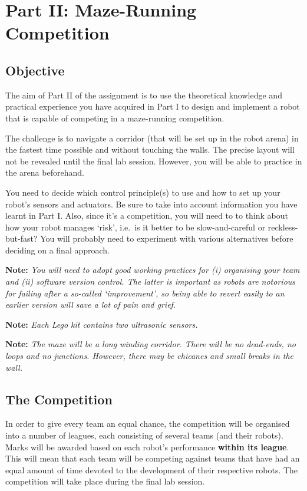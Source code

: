\documentclass[hidelinks,a4paper,11pt]{article}
\begin{document}
\newpage
\section{Part II: Maze-Running Competition}

\subsection{Objective}

The aim of Part II of the assignment is to use the theoretical knowledge and practical experience you have acquired in Part I to design and implement a robot that is capable of competing in a maze-running competition.

The challenge is to navigate a corridor (that will be set up in the robot arena) in the fastest time possible and without touching the walls.  The precise layout will not be revealed until the final lab session.  However, you will be able to practice in the arena beforehand.

You need to decide which control principle(s) to use and how to set up your robot's sensors and actuators.  Be sure to take into account information you have learnt in Part I.  Also, since it's a competition, you will need to to think about how your robot manages `risk', i.e.\ is it better to be slow-and-careful or reckless-but-fast?  You will probably need to experiment with various alternatives before deciding on a final approach.

{\bfseries Note:}  \emph{You will need to adopt good working practices for (i) organising your team and (ii) software version control.  The latter is important as robots are notorious for failing after a so-called `improvement', so being able to revert easily to an earlier version will save a lot of pain and grief.}

{\bfseries Note:}  \emph{Each Lego kit contains two ultrasonic sensors.}

{\bfseries Note:}  \emph{The maze will be a long winding corridor.  There will be no dead-ends, no loops and no junctions.  However, there may be chicanes and small breaks in the wall.}


\subsection{The Competition}

In order to give every team an equal chance, the competition will be organised into a number of leagues, each consisting of several teams (and their robots).  Marks will be awarded based on each robot's performance \textbf{within its league}.  This will mean that each team will be competing against teams that have had an equal amount of time devoted to the development of their respective robots.  The competition will take place during the final lab session.
\end{document}
